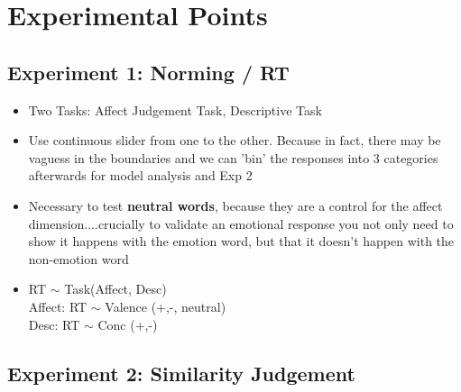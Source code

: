 \documentclass[12pt,letterpaper,table,svgnames,dvipsnames]{article}
\begin{document}




\section{Experimental Points}


\subsection{Experiment 1: Norming / RT}


\begin{itemize}

    \item Two Tasks: Affect Judgement Task, Descriptive Task

    \item Use continuous slider from one to the other. Because in fact, there may be vaguess in the boundaries and we can 'bin' the responses into 3 categories afterwards for model analysis and Exp 2

    \item Necessary to test \textbf{neutral words}, because they are a control for the affect dimension....crucially to validate an emotional response you not only need to show it happens with the emotion word, but that it doesn't happen with the non-emotion word


    \item RT $\sim$ Task(Affect, Desc)\\
    Affect: RT $\sim$ Valence (+,-, neutral)\\
    Desc: RT $\sim$ Conc (+,-)



\end{itemize}

\subsection{Experiment 2: Similarity Judgement}
\end{document}
